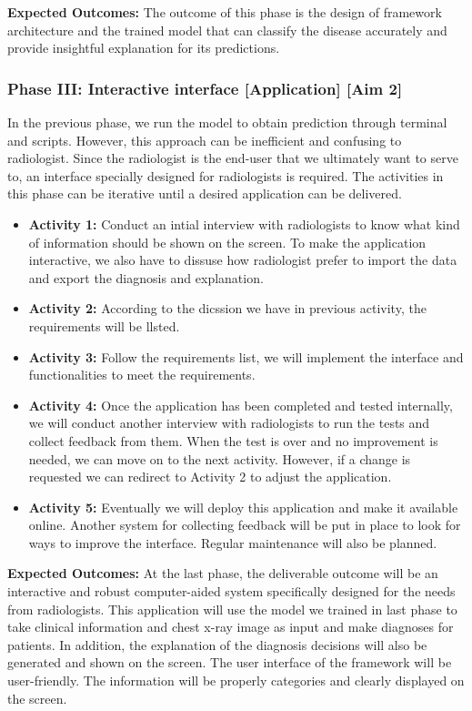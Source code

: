 \textbf{Expected Outcomes:}
The outcome of this phase is the design of framework architecture and the trained model that can classify the disease accurately and provide insightful explanation for its predictions.

\subsubsection*{Phase III: Interactive interface [Application] [Aim 2]}
In the previous phase, we run the model to obtain prediction through terminal and scripts. However, this approach can be inefficient and confusing to radiologist. Since the radiologist is the end-user that we ultimately want to serve to, an interface specially designed for radiologists is required. The activities in this phase can be iterative until a desired application can be delivered.

\begin{itemize}
    \item \textbf{Activity 1:} Conduct an intial interview with radiologists to know what kind of information should be shown on the screen. To make the application interactive, we also have to dissuse how radiologist prefer to import the data and export the diagnosis and explanation. 
    \item \textbf{Activity 2:} According to the dicssion we have in previous activity, the requirements will be llsted.
    \item \textbf{Activity 3:} Follow the requirements list, we will implement the interface and functionalities to meet the requirements.
    \item \textbf{Activity 4:} Once the application has been completed and tested internally, we will conduct another interview with radiologists to run the tests and collect feedback from them. When the test is over and no improvement is needed, we can move on to the next activity. However, if a change is requested we can redirect to Activity 2 to adjust the application.    
    \item \textbf{Activity 5:} Eventually we will deploy this application and make it available online. Another system for collecting feedback will be put in place to look for ways to improve the interface. Regular maintenance will also be planned.
\end{itemize}


\textbf{Expected Outcomes:}
At the last phase, the deliverable outcome will be an interactive and robust computer-aided system specifically designed for the needs from radiologists. This application will use the model we trained in last phase to take clinical information and chest x-ray image as input and make diagnoses for patients. In addition, the explanation of the diagnosis decisions will also be generated and shown on the screen. The user interface of the framework will be user-friendly. The information will be properly categories and clearly displayed on the screen.

